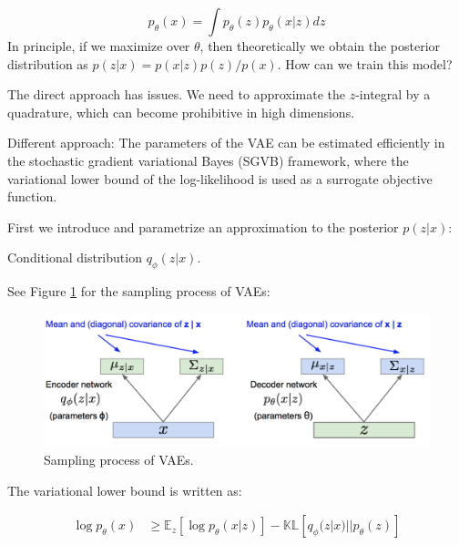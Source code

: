 \documentclass[english]{article}
\begin{document}
$$p_\theta(x) 
= \int 
p_\theta(z)p_\theta(x|z)dz
$$
In principle, if we maximize over $\theta$, then theoretically we obtain the posterior distribution as $p(z|x) = p(x|z)p(z)/p(x)$. How can we train this model?

The direct approach has issues. We need to approximate the $z$-integral by a quadrature, which can become prohibitive in high dimensions.

\item Different approach:
The parameters of the VAE can be estimated efficiently in the stochastic gradient variational Bayes (SGVB) framework, where the variational lower bound of the log-likelihood is used as a surrogate objective function. 

First we introduce and parametrize an approximation to the posterior $p(z|x)$:
\benum 
\item  Conditional distribution $q_\phi(z|x)$.
\eenum 

See Figure \ref{svae} for the sampling process of VAEs:
\begin{figure}[H]\centering
\includegraphics[width=12cm]{VAE_P1}
\caption{Sampling process of VAEs.}
   \label{svae}
\end{figure}




The variational lower bound is written as:

\begin{align*}
	\log p_{\theta}(x) %
	&\geq\mathbb{E}_{z}[\log p_{\theta}(x|z)] - \mathbb{KL}[q_{\phi}(z|x)||p_{\theta}(z)]
\end{align*}





\item 
\end{document}
